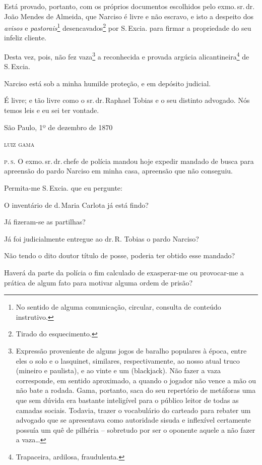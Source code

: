 Está provado, portanto, com os próprios documentos escolhidos pelo exmo.\,sr.\,dr.\,João Mendes de Almeida, que Narciso é livre e não escravo, e
isto a despeito dos \emph{avisos} e \emph{pastorais}\footnote{ No
  sentido de alguma comunicação, circular, consulta de conteúdo
  instrutivo.} desencavados\footnote{ Tirado do esquecimento.} por
S.\,Excia. para firmar a propriedade do seu infeliz cliente.

Desta vez, pois, não fez vaza\footnote{ Expressão proveniente de
  alguns jogos de baralho populares à época, entre eles o solo e o
  lasquinet, similares, respectivamente, ao nosso atual truco (mineiro e
  paulista), e ao vinte e um (blackjack). Não fazer a vaza corresponde,
  em sentido aproximado, a quando o jogador não vence a mão ou não bate
  a rodada. Gama, portanto, saca do seu repertório de metáforas uma que
  sem dúvida era bastante inteligível para o público leitor de todas as
  camadas sociais. Todavia, trazer o vocabulário do carteado para
  rebater um advogado que se apresentava como autoridade sisuda e
  inflexível certamente possuía um quê de pilhéria -- sobretudo por ser
  o oponente aquele a não fazer a vaza\ldots{}} a reconhecida e provada
argúcia alicantineira\footnote{ Trapaceira, ardilosa, fraudulenta.}
de S.\,Excia.

Narciso está sob a minha humilde proteção, e em depósito judicial.

É livre; e tão livre como o sr.\,dr.\,Raphael Tobias e o seu distinto
advogado. Nós temos leis e eu sei ter vontade.

\begin{flushright}
São Paulo, 1º de dezembro de 1870

\textsc{luiz gama}
\end{flushright}

\textsc{p.\,s.} O exmo.\,sr.\,dr.\,chefe de polícia mandou hoje expedir mandado de
busca para apreensão do pardo Narciso em minha casa, apreensão que não
conseguiu.

Permita-me S.\,Excia. que eu pergunte:

O inventário de d.\,Maria Carlota já está findo?

Já fizeram-se as partilhas?

Já foi judicialmente entregue ao dr.\,R. Tobias o pardo Narciso?

Não tendo o dito doutor título de posse, poderia ter obtido esse
mandado?

Haverá da parte da polícia o fim calculado de exasperar-me ou
provocar-me a prática de algum fato para motivar alguma ordem de prisão?

